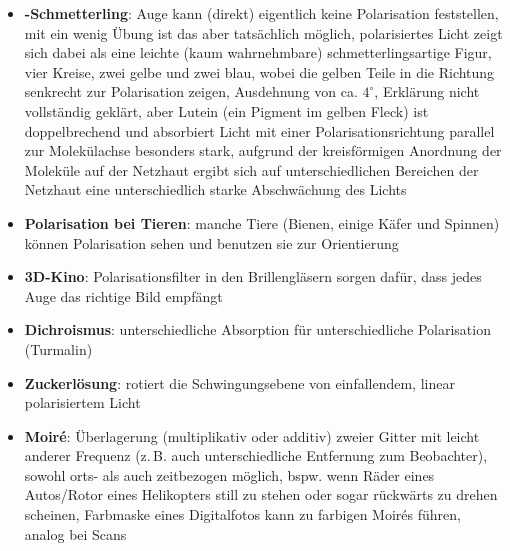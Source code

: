 \begin{itemize}
    \item
    \textbf{-Schmetterling}:
    Auge kann (direkt) eigentlich keine Polarisation feststellen,
    mit ein wenig Übung ist das aber tatsächlich möglich,
    polarisiertes Licht zeigt sich dabei als eine leichte
    (kaum wahrnehmbare) schmetterlingsartige Figur,
    vier Kreise, zwei gelbe und zwei blau, wobei die gelben Teile in
    die Richtung senkrecht zur Polarisation zeigen,
    Ausdehnung von ca. $4^\circ$,
    Erklärung nicht vollständig geklärt,
    aber Lutein (ein Pigment im gelben Fleck) ist doppelbrechend und
    absorbiert Licht mit einer Polarisationsrichtung parallel zur Molekülachse
    besonders stark, aufgrund der kreisförmigen Anordnung der Moleküle
    auf der Netzhaut ergibt sich auf unterschiedlichen Bereichen der Netzhaut
    eine unterschiedlich starke Abschwächung des Lichts
    
    \item
    \textbf{Polarisation bei Tieren}:
    manche Tiere (Bienen, einige Käfer und Spinnen) können Polarisation sehen
    und benutzen sie zur Orientierung
    
    \item
    \textbf{3D-Kino}:
    Polarisationsfilter in den Brillengläsern sorgen dafür, dass jedes Auge
    das richtige Bild empfängt
    
    \item
    \textbf{Dichroismus}:
    unterschiedliche Absorption für unterschiedliche Polarisation
    (Turmalin)
    
    \item
    \textbf{Zuckerlösung}:
    rotiert die Schwingungsebene von einfallendem, linear polarisiertem Licht
\end{itemize}
\linie
\begin{itemize}
    \item
    \textbf{Moiré}:
    Überlagerung (multiplikativ oder additiv) zweier Gitter mit leicht
    anderer Frequenz
    (z.\,B. auch unterschiedliche Entfernung zum Beobachter),
    sowohl orts- als auch zeitbezogen möglich,
    bspw. wenn Räder eines Autos/Rotor eines Helikopters still zu stehen oder
    sogar rückwärts zu drehen scheinen,
    Farbmaske eines Digitalfotos kann zu farbigen Moirés führen,
    analog bei Scans
\end{itemize}

\pagebreak
